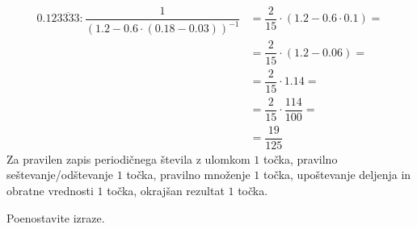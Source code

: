 \documentclass[addpoints]{exam}
\begin{document}
\begin{questions}
\begin{parts}
        \begin{solution}[12cm]
            \begin{align*}
                0.12\overline{3333}: \dfrac{1}{\left(1.2-0.6\cdot\left(0.18-0.03\right)\right)^{-1}} &= \dfrac{2}{15}\cdot \left(1.2-0.6\cdot 0.1\right)= \\
                                                                                        &= \dfrac{2}{15}\cdot \left(1.2-0.06\right)= \\
                                                                                        &= \dfrac{2}{15}\cdot 1.14= \\
                                                                                        &= \dfrac{2}{15}\cdot \dfrac{114}{100}= \\
                                                                                        &= \dfrac{19}{125}
            \end{align*}
            Za pravilen zapis periodičnega števila z ulomkom $1$ točka, pravilno seštevanje/odštevanje $1$ točka, pravilno množenje $1$ točka, upoštevanje deljenja in obratne vrednosti $1$ točka, okrajšan rezultat $1$ točka.
        \end{solution}

    \end{parts}






    


        \question
        Poenostavite izraze.
\end{questions}
\end{document}
